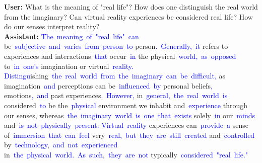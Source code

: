 \begin{tcolorbox}[colframe=gray!70!black,colback=white, title=Sample 1]
\textbf{User:}
What is the meaning of "real life"? How does one distinguish the real world from the imaginary? Can virtual reality experiences be considered real life? How do our senses interpret reality? \vspace{0.1in}
\\
\textbf{Assistant:}
\textcolor{blue}{The}\textcolor{blue}{~meaning}\textcolor{blue}{~of}\textcolor{blue}{~"}\textcolor{blue}{real}\textcolor{blue}{~life}\textcolor{blue}{"}\textcolor{blue}{~can} be\textcolor{blue}{~subjective}\textcolor{blue}{~and}\textcolor{blue}{~varies}\textcolor{blue}{~from}\textcolor{blue}{~person}\textcolor{blue}{~to} person\textcolor{blue}{.}\textcolor{blue}{~Generally}\textcolor{blue}{,}\textcolor{blue}{~it} refers to experiences and interactions\textcolor{blue}{~that} occur\textcolor{blue}{~in} the physical\textcolor{blue}{~world}\textcolor{blue}{,}\textcolor{blue}{~as}\textcolor{blue}{~opposed} to\textcolor{blue}{~in}\textcolor{blue}{~one}\textcolor{blue}{'s} imagination or virtual\textcolor{blue}{~reality}\textcolor{blue}{.}\textcolor{blue}{~
}\textcolor{blue}{D}\textcolor{blue}{istingu}ishing\textcolor{blue}{~the}\textcolor{blue}{~real}\textcolor{blue}{~world}\textcolor{blue}{~from}\textcolor{blue}{~the}\textcolor{blue}{~imaginary}\textcolor{blue}{~can}\textcolor{blue}{~be}\textcolor{blue}{~difficult}\textcolor{blue}{,} as imagination\textcolor{blue}{~and} perceptions can be\textcolor{blue}{~influenced}\textcolor{blue}{~by} personal beliefs\textcolor{blue}{,} emotions\textcolor{blue}{,}\textcolor{blue}{~and} past experiences\textcolor{blue}{.}\textcolor{blue}{~However}\textcolor{blue}{,} in\textcolor{blue}{~general}\textcolor{blue}{,}\textcolor{blue}{~the}\textcolor{blue}{~real}\textcolor{blue}{~world}\textcolor{blue}{~is} considered\textcolor{blue}{~to} be the\textcolor{blue}{~physical} environment we inhabit and\textcolor{blue}{~experience} through our senses, whereas\textcolor{blue}{~the}\textcolor{blue}{~imaginary}\textcolor{blue}{~world}\textcolor{blue}{~is}\textcolor{blue}{~one}\textcolor{blue}{~that}\textcolor{blue}{~exists} solely\textcolor{blue}{~in} our\textcolor{blue}{~minds} and\textcolor{blue}{~is}\textcolor{blue}{~not}\textcolor{blue}{~physically}\textcolor{blue}{~present}\textcolor{blue}{.
}\textcolor{blue}{Virtual}\textcolor{blue}{~reality} experiences can\textcolor{blue}{~provide}\textcolor{blue}{~a} sense of\textcolor{blue}{~immersion}\textcolor{blue}{~that}\textcolor{blue}{~can}\textcolor{blue}{~feel} very\textcolor{blue}{~real}\textcolor{blue}{,}\textcolor{blue}{~but}\textcolor{blue}{~they}\textcolor{blue}{~are}\textcolor{blue}{~still}\textcolor{blue}{~created} and\textcolor{blue}{~controlled} by\textcolor{blue}{~technology},\textcolor{blue}{~and}\textcolor{blue}{~not}\textcolor{blue}{~experienced} in\textcolor{blue}{~the}\textcolor{blue}{~physical}\textcolor{blue}{~world}\textcolor{blue}{.}\textcolor{blue}{~As}\textcolor{blue}{~such},\textcolor{blue}{~they}\textcolor{blue}{~are}\textcolor{blue}{~not} typically\textcolor{blue}{~considered}\textcolor{blue}{~"}\textcolor{blue}{real}\textcolor{blue}{~life}\textcolor{blue}{."}\textcolor{blue}{~
}
\end{tcolorbox}
